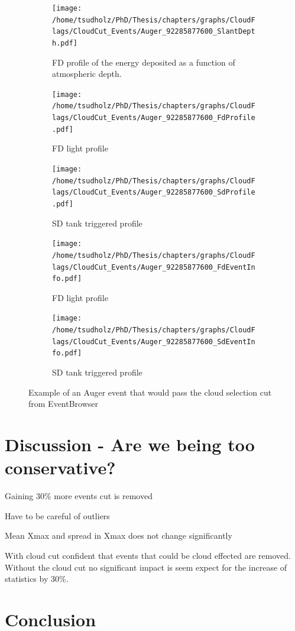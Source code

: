 \begin{figure}
\centering
 \vspace{2cm}
  \begin{subfigure}[b]{\textwidth}
  \centering
  \texttt{[image: /home/tsudholz/PhD/Thesis/chapters/graphs/CloudFlags/CloudCut\_Events/Auger\_92285877600\_SlantDepth.pdf]}
  \caption{FD profile of the energy deposited as a function of atmospheric depth.}
  \end{subfigure}
 \vspace{0.5cm}
  \begin{subfigure}[b]{0.45\textwidth}
  	\centering
  	\texttt{[image: /home/tsudholz/PhD/Thesis/chapters/graphs/CloudFlags/CloudCut\_Events/Auger\_92285877600\_FdProfile.pdf]}
  	\caption{FD light profile}
  \end{subfigure}
  \begin{subfigure}[b]{0.45\textwidth}
  	\centering
  	\texttt{[image: /home/tsudholz/PhD/Thesis/chapters/graphs/CloudFlags/CloudCut\_Events/Auger\_92285877600\_SdProfile.pdf]}
  	\caption{SD tank triggered profile}
  \end{subfigure}

  \begin{subfigure}[b]{0.45\textwidth}
  	\centering
	\texttt{[image: /home/tsudholz/PhD/Thesis/chapters/graphs/CloudFlags/CloudCut\_Events/Auger\_92285877600\_FdEventInfo.pdf]}
  	\caption{FD light profile}
  \end{subfigure}
  \begin{subfigure}[b]{0.45\textwidth}
  	\centering
	\texttt{[image: /home/tsudholz/PhD/Thesis/chapters/graphs/CloudFlags/CloudCut\_Events/Auger\_92285877600\_SdEventInfo.pdf]}
  	\caption{SD tank triggered profile}
  \end{subfigure}
  \caption{Example of an Auger event that would pass the cloud selection cut from EventBrowser}
\end{figure}

\section{Discussion - Are we being too conservative?}

Gaining 30\% more events cut is removed

Have to be careful of outliers

Mean Xmax and spread in Xmax does not change significantly

With cloud cut confident that events that could be cloud effected are removed. Without the cloud cut no significant impact is seem expect for the increase of statistics by 30\%.


\section{Conclusion}
